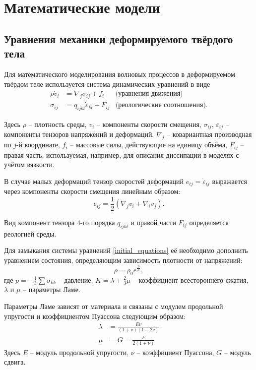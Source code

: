 \section{Математические модели}

\subsection{Уравнения механики деформируемого твёрдого тела}
Для математического моделирования волновых процессов в деформируемом твёрдом
теле используется система динамических уравнений \cite{novatsky,sedov} в виде
\begin{align}
\label{initial_equations}
\rho\dot{v}_i &= \nabla_j\sigma_{ij}+f_i & \textrm{(уравнения движения)}\nonumber\\
\sigma_{ij} &= q_{ijkl}\dot{\varepsilon}_{kl}+F_{ij} & \textrm{(реологические
соотношения).}
\end{align}

Здесь $\rho$ – плотность среды, $v_i$ – компоненты скорости смещения,
$\sigma_{ij}$, $\varepsilon_{ij}$ -- компоненты тензоров напряжений и деформаций,
$\nabla_j$ – ковариантная производная по $j$-й координате, $f_i$ – массовые
силы, действующие на единицу объёма, $F_{ij}$ -- правая часть, используемая, например, для описания диссипации в моделях с учётом вязкости.

В случае малых деформаций тензор скоростей деформаций $e_{ij}=\dot{\varepsilon}_{ij}$ 
выражается через компоненты скорости смещения линейным образом:
\begin{equation}
e_{ij}=\frac{1}{2}(\nabla_j v_i+\nabla_i v_j).
\end{equation}

Вид компонент тензора 4-го порядка $q_{ijkl}$ и правой части $F_{ij}$ определяется реологией среды.

Для замыкания системы уравнений \ref{initial_equations} её необходимо дополнить
уравнением состояния, определяющим зависимость плотности от напряжений:
\begin{equation}
\rho=\rho_0e^{\frac{p}{K}},
\end{equation}
где $p=-\frac{1}{3}\sum\sigma_{kk}$ -- давление, $K=\lambda+\frac{2}{3}\mu$ --
коэффициент всестороннего сжатия, $\lambda$ и $\mu$ -- параметры Ламе.

Параметры Ламе зависят от материала и связаны с модулем продольной упругости и коэффициентом Пуассона следующим образом:
\begin{align}
\label{lame_parameters}
\lambda &= \frac{E\nu}{(1+\nu)(1-2\nu)}
\nonumber\\
\mu &= G=\frac{E}{2(1+\nu)}
\end{align}
Здесь $E$ -- модуль продольной упругости, $\nu$ -- коэффициент Пуассона, $G$ -- модуль сдвига.

